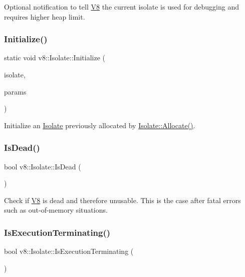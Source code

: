Optional notification to tell \mbox{\hyperlink{classv8_1_1V8}{V8}} the current isolate is used for debugging and requires higher heap limit. \mbox{\label{classv8_1_1Isolate_a508901d16ef77659eb9e2b3dd476db07}} 
\subsubsection{\texorpdfstring{Initialize()}{Initialize()}}
{\footnotesize\ttfamily static void v8\+::\+Isolate\+::\+Initialize (\begin{DoxyParamCaption}\item[{\mbox{\hyperlink{classv8_1_1Isolate}{Isolate}} $\ast$}]{isolate,  }\item[{const \mbox{\hyperlink{structv8_1_1Isolate_1_1CreateParams}{Create\+Params}} \&}]{params }\end{DoxyParamCaption})\hspace{0.3cm}{\ttfamily [static]}}

Initialize an \mbox{\hyperlink{classv8_1_1Isolate}{Isolate}} previously allocated by \mbox{\hyperlink{classv8_1_1Isolate_a6c0fccd7594c848dc388fd538106b6c7}{Isolate\+::\+Allocate()}}. \mbox{\label{classv8_1_1Isolate_a603a9bc7860d7936bce2dd45829869c3}} 
\subsubsection{\texorpdfstring{Is\+Dead()}{IsDead()}}
{\footnotesize\ttfamily bool v8\+::\+Isolate\+::\+Is\+Dead (\begin{DoxyParamCaption}{ }\end{DoxyParamCaption})}

Check if \mbox{\hyperlink{classv8_1_1V8}{V8}} is dead and therefore unusable. This is the case after fatal errors such as out-\/of-\/memory situations. \mbox{\label{classv8_1_1Isolate_aee57283198c192e83afe5e7d12d42e85}} 
\subsubsection{\texorpdfstring{Is\+Execution\+Terminating()}{IsExecutionTerminating()}}
{\footnotesize\ttfamily bool v8\+::\+Isolate\+::\+Is\+Execution\+Terminating (\begin{DoxyParamCaption}{ }\end{DoxyParamCaption})}

